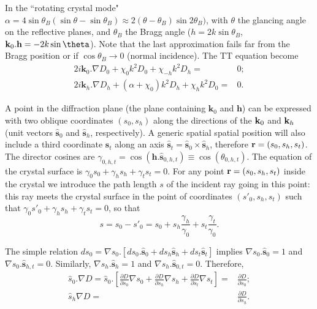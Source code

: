 \documentclass[preprint]{iucr}              %
\newcommand{\inred}[1]{{\color{red}#1}}
\begin{document}
In the ``rotating crystal mode" $\alpha=4 \sin \theta_B (\sin \theta - \sin \theta_B) \approx 2 (\theta-\theta_B) \sin 2\theta_B)$, with $\theta$ the glancing angle on the reflective planes, and $\theta_B$ the Bragg angle ($h=2 k \sin\theta_B$, $\textbf k_0 . \textbf h = -2 k \sin\theta$). Note that the last approximation fails far from the Bragg position or if $\cos\theta_B \rightarrow 0$ (normal incidence). The TT equation become
\begin{subequations}
\label{eq:TTvectorAlpha}
\begin{align}
2 i \textbf{k}_0 . \nabla D_0 + \chi_0 k^2 D_0 + \chi_{-h} k^2 D_h =& 0; \\
2 i \textbf{k}_h . \nabla D_h + (\alpha + \chi_0) k^2 D_h + \chi_{h} k^2 D_0 =& 0.
\end{align}
\end{subequations}

A point in the diffraction plane (the plane containing $\textbf{k}_0$ and $\textbf{h}$) 
can be expressed with two oblique coordinates $(s_0,s_h)$ along the directions of the $\textbf k_0$ and $\textbf k_h$ (unit vectors $\hat{ \textbf{s}}_{0}$ and $\hat{ \textbf{s}}_{h}$, respectively). A generic spatial spatial position will also include a third coordinate $\textbf{s}_t$ along an axis $\hat{\textbf{s}}_t=\hat{\textbf{s}}_0 \times \hat{\textbf{s}}_h$, therefore $\textbf r=(s_0,s_h,s_t)$. The director cosines are $\gamma_{0,h,t}=\cos(\textbf{h} . \hat{\textbf{s}}_{0,h,t}) \equiv \cos(\theta_{0,h,t})$. The equation of the crystal surface is $\gamma_0 s_0 + \gamma_h s_h + \gamma_t s_t=0$. For any point $\textbf r=(s_0,s_h,s_t)$ inside the crystal we introduce the path length $s$ \inred{of the incident ray going in this point}: this ray meets the crystal surface in the point of coordinates $(s'_0,s_h,s_t)$ such that $\gamma_0 s'_0+\gamma_h s_h + \gamma_t s_t=0$, so that 
\begin{equation}
\label{eq:s}
s = s_0 - s'_0 = s_0 + s_h \frac{\gamma_h}{\gamma_0} + s_t \frac{\gamma_t}{\gamma_0}.
\end{equation}

The simple relation $d s_0 = \nabla s_0 . [ d s_0 . \hat{\textbf{s}}_0 + d s_h \hat{\textbf{s}}_h + d s_t \hat{\textbf{s}}_t ]$ implies $\nabla s_0 . \hat{\textbf{s}}_0=1$ and $\nabla s_0 . \hat{\textbf{s}}_{h,t}=0$. Similarly, $\nabla s_h . \hat{\textbf{s}}_h=1$ and $\nabla s_h . \hat{\textbf{s}}_{0,t}=0$. Therefore, 
\begin{subequations}
\label{eq:equalities}
\begin{align}
\hat s_0 . \nabla D=
\hat s_0 . \left[ 
\frac{\partial D}{\partial s_0} \nabla s_0 + 
\frac{\partial D}{\partial s_h} \nabla s_h +
\frac{\partial D}{\partial s_t} \nabla s_t
\right] 
=& \frac{\partial D}{\partial s_0}
; \\
\hat s_h \nabla D =& 
\frac{\partial D}{\partial s_h}.
\end{align}
\end{subequations}
\end{document}
